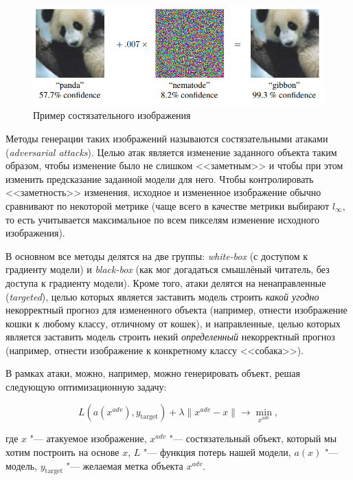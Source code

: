 \documentclass[12pt,a4paper]{article}
\begin{document}
\begin{center}
	\begin{figure}[!htb]
		\centering
		\includegraphics[width=0.9\linewidth]{adversarial_attack.png}
		\caption{Пример состязательного изображения}
	\end{figure}
\end{center}


\par Методы генерации таких изображений называются состязательными атаками (\emph{adversarial attacks}). Целью атак является изменение заданного объекта таким образом, чтобы изменение было не слишком <<заметным>> и чтобы при этом изменить предсказание заданной модели для него. Чтобы контролировать <<заметность>> изменения, исходное и измененное изображение обычно сравнивают по некоторой метрике (чаще всего в качестве метрики выбирают $l_{\infty}$, то есть учитывается максимальное по всем пикселям изменение исходного изображения).
\par В основном все методы делятся на две группы: \emph{white-box} (с доступом к градиенту модели) и \emph{black-box} (как мог догадаться смышлёный читатель, без доступа к градиенту модели). Кроме того, атаки делятся на ненаправленные (\emph{targeted}), целью которых является заставить модель строить \emph{какой угодно} некорректный прогноз для измененного объекта (например, отнести изображение кошки к любому классу, отличному от кошек), и направленные, целью которых является заставить модель строить некий \emph{определенный} некорректный прогноз (например, отнести изображение к конкретному классу <<собака>>).
\newpage
\par В рамках атаки, можно, например, можно генерировать объект, решая следующую оптимизационную задачу:

$$
L(a(x^{adv}), y_{\text{target}}) + \lambda \lVert x^{adv} - x \rVert \to \min_{x^{adv}},
$$

где $x$ "--- атакуемое изображение, $x^{adv}$ "--- состязательный объект, который мы хотим построить на основе $x$, $L$ "--- функция потерь нашей модели, $a(x)$ "--- модель, $y_{\text{target}}$ "--- желаемая метка объекта $x^{adv}$.
\end{document}
